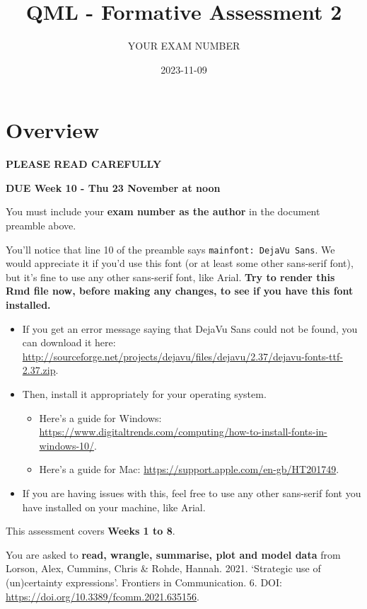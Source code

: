 \documentclass[
]{article}
\title{QML - Formative Assessment 2}
\author{YOUR EXAM NUMBER}
\date{2023-11-09}
\providecommand{\tightlist}{%
  \setlength{\itemsep}{0pt}\setlength{\parskip}{0pt}}
\begin{document}
\maketitle

\section{Overview}\label{overview}

\textbf{PLEASE READ CAREFULLY}

\textbf{DUE Week 10 - Thu 23 November at noon}

You must include your \textbf{exam number as the author} in the document
preamble above.

You'll notice that line 10 of the preamble says
\texttt{mainfont:\ DejaVu\ Sans}. We would appreciate it if you'd use
this font (or at least some other sans-serif font), but it's fine to use
any other sans-serif font, like Arial. \textbf{Try to render this Rmd
file now, before making any changes, to see if you have this font
installed.}

\begin{itemize}
\tightlist
\item
  If you get an error message saying that DejaVu Sans could not be
  found, you can download it here:
  \url{http://sourceforge.net/projects/dejavu/files/dejavu/2.37/dejavu-fonts-ttf-2.37.zip}.
\item
  Then, install it appropriately for your operating system.

  \begin{itemize}
  \tightlist
  \item
    Here's a guide for Windows:
    \url{https://www.digitaltrends.com/computing/how-to-install-fonts-in-windows-10/}.
  \item
    Here's a guide for Mac:
    \url{https://support.apple.com/en-gb/HT201749}.
  \end{itemize}
\item
  If you are having issues with this, feel free to use any other
  sans-serif font you have installed on your machine, like Arial.
\end{itemize}

This assessment covers \textbf{Weeks 1 to 8}.

You are asked to \textbf{read, wrangle, summarise, plot and model data}
from Lorson, Alex, Cummins, Chris \& Rohde, Hannah. 2021. `Strategic use
of (un)certainty expressions'. Frontiers in Communication. 6. DOI:
\url{https://doi.org/10.3389/fcomm.2021.635156}.
\end{document}
